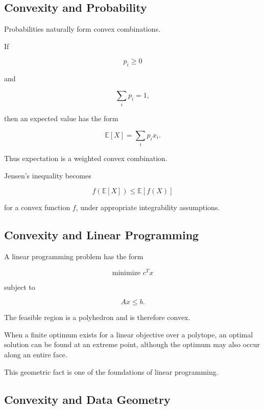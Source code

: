 \subsection{Convexity and Probability}
\label{subsec:convexity-probability}

Probabilities naturally form convex combinations.

If

\[
p_i\geq0
\]

and

\[
\sum_i p_i=1,
\]

then an expected value has the form

\[
\boxed{
\mathbb{E}[X]
=
\sum_i p_ix_i.
}
\]

Thus expectation is a weighted convex combination.

Jensen's inequality becomes

\[
\boxed{
f(\mathbb{E}[X])
\leq
\mathbb{E}[f(X)]
}
\]

for a convex function \(f\), under appropriate integrability assumptions.

\subsection{Convexity and Linear Programming}
\label{subsec:convexity-linear-programming}

A linear programming problem has the form

\[
\boxed{
\text{minimize }c^Tx
}
\]

subject to

\[
\boxed{
Ax\leq b.
}
\]

The feasible region is a polyhedron and is therefore convex.

When a finite optimum exists for a linear objective over a polytope, an
optimal solution can be found at an extreme point, although the optimum may
also occur along an entire face.

This geometric fact is one of the foundations of linear programming.

\subsection{Convexity and Data Geometry}
\label{subsec:convexity-data-geometry}

